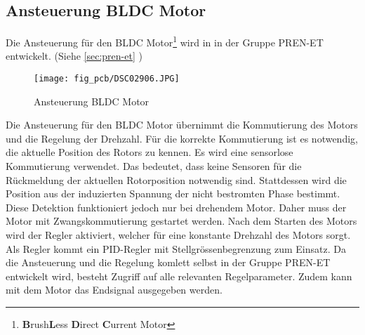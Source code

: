 \subsection{Ansteuerung BLDC Motor}
\label{sec:bldc}
Die Ansteuerung für den BLDC Motor\footnote{\textbf{B}rush\textbf{L}ess 
\textbf{D}irect \textbf{C}urrent Motor} wird in in der Gruppe PREN-ET 
entwickelt. (Siehe \ref{sec:pren-et} ) 
\begin{figure}[h!]
    \centering
    \texttt{[image: fig\_pcb/DSC02906.JPG]}
    \caption{Ansteuerung BLDC Motor}
    \label{fig:dc}
\end{figure}

\noindent
Die Ansteuerung für den BLDC Motor übernimmt die Kommutierung des Motors und 
die Regelung der Drehzahl. Für die korrekte Kommutierung ist es notwendig, die 
aktuelle Position des Rotors zu kennen. Es wird eine sensorlose Kommutierung 
verwendet. Das bedeutet, dass keine Sensoren für die Rückmeldung der aktuellen 
Rotorposition notwendig sind. Stattdessen wird die Position aus der 
induzierten Spannung der nicht bestromten Phase bestimmt. Diese Detektion 
funktioniert jedoch nur bei drehendem Motor. Daher muss der Motor mit 
Zwangskommutierung gestartet werden. Nach dem Starten des Motors wird der 
Regler aktiviert, welcher für eine konstante Drehzahl des Motors sorgt. Als 
Regler kommt ein PID-Regler mit Stellgrössenbegrenzung zum Einsatz. Da die 
Ansteuerung und die Regelung komlett selbst in der Gruppe PREN-ET entwickelt 
wird, besteht Zugriff auf alle relevanten Regelparameter. Zudem kann mit dem 
Motor das Endsignal ausgegeben werden. 

